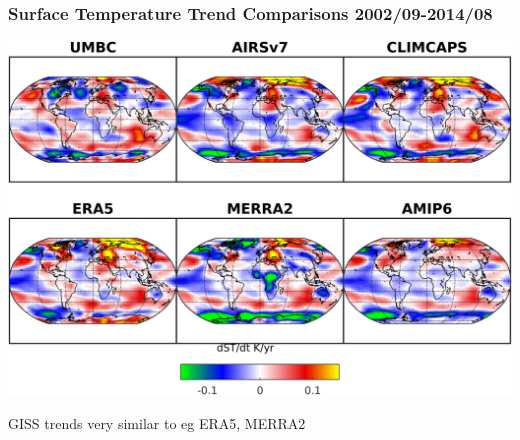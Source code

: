 \documentclass[10pt,t]{beamer}
\begin{document}
\begin{frame}
\frametitle{Surface Temperature Trend Comparisons 2002/09-2014/08}  
\vspace{-0.15in}
\begin{center}
\includegraphics[width=0.9\linewidth]{Figs2002_2014/stemp_trends_2002_2014_amip6.png}
\end{center}

\footnotesize
GISS trends very similar to eg ERA5, MERRA2

\end{frame}
\end{document}

